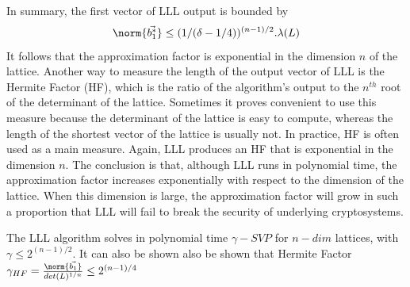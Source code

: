 In summary, the first vector of LLL output is bounded by
\[
  \norm{\vec{b_1^*}} \leq (1/(\delta-1/4))^{(n-1)/2}.\lambda(L)
\]
It follows that the approximation factor is exponential in the dimension $n$ of
the lattice. Another way to measure the length of the output vector of LLL is
the Hermite Factor (HF), which is the ratio of the algorithm's output to the
$n^{th}$ root of the determinant of the lattice. Sometimes it proves convenient
to use this measure because the determinant of the lattice is easy to compute,
whereas the length of the shortest vector of the lattice is usually not. In
practice, HF is often used as a main measure. Again, LLL produces an HF that is
exponential in the dimension $n$. The conclusion is that, although LLL runs in
polynomial time, the approximation factor increases exponentially with respect
to the dimension of the lattice. When this dimension is large, the approximation
factor will grow in such a proportion that LLL will fail to break the security
of underlying cryptosystems.
\begin{theorem}
  The LLL algorithm solves in polynomial time $\gamma-SVP$ for $n-dim$ lattices,
  with $\gamma \leq 2^{(n-1)/2}$. It can also be shown also be shown that Hermite Factor
  $\gamma_{HF} = \frac{\norm{\vec{b_1}}}{det(L)^{1/n}} \leq 2^{(n-1)/4}$
  \label{theo:LLLHF}
\end{theorem}




